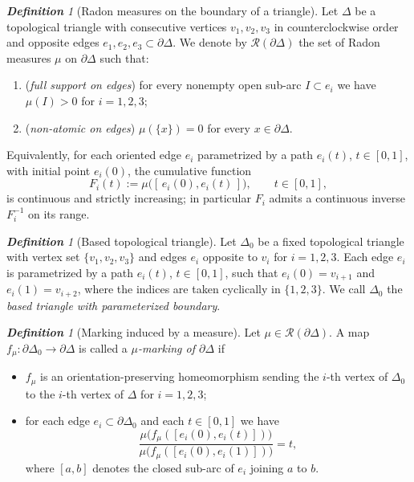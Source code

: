 \documentclass[11pt, letterpaper]{amsart}
\theoremstyle{definition}
\theoremstyle{remark}
\newtheorem{definition}[theorem]{\rm\bf Definition}
\newcommand{\cR}{\mathcal{R}}
\newcommand{\DEF}{} \newcommand{\WARN}{\textcolor{red}} \newcommand{\ALT}{\textcolor{brown}} \newcommand{\TODO}{\textcolor{teal}} %
\numberwithin{equation}{section}
\begin{document}
\begin{definition}[Radon measures on the boundary of a triangle]
\label{def:R(Delta)}
Let $\Delta$ be a topological triangle with consecutive vertices
$v_1,v_2,v_3$ in counterclockwise order and opposite edges
$e_1,e_2,e_3\subset\partial\Delta$.  We denote by $\cR(\partial\Delta)$ the set
of Radon measures $\mu$ on $\partial\Delta$ such that:
\begin{enumerate}
\item[(a)] (\emph{full support on edges}) for every nonempty open sub-arc
  $I\subset e_i$ we have $\mu(I)>0$ for $i=1,2,3$;
\item[(b)] (\emph{non-atomic on edges}) $\mu(\{x\})=0$ for every
  $x\in\partial\Delta$.
\end{enumerate}
Equivalently, for each oriented edge $e_i$ parametrized by a path
$e_i(t)$, \(t\in[0,1]\), with initial point $e_i(0)$, the cumulative function
\[
F_i(t):=\mu\big([\,e_i(0),e_i(t)\,]\big), \qquad t\in[0,1],
\]
is continuous and strictly increasing; in particular $F_i$ admits a continuous
inverse $F_i^{-1}$ on its range.
\end{definition}

\begin{definition}[Based topological triangle]
\label{def:based.triang}
Let $\Delta_0$ be a fixed topological triangle with vertex set
$\{v_1,v_2,v_3\}$ and edges $e_i$ opposite to $v_i$ for $i=1,2,3$.  Each edge
$e_i$ is parametrized by a path $e_i(t)$, \(t\in[0,1]\), such that
$e_i(0)=v_{i+1}$ and $e_i(1)=v_{i+2}$, where the indices are taken cyclically
in $\{1,2,3\}$.  We call $\Delta_0$ the \DEF{\em based triangle with
parameterized boundary}.
\end{definition}

\begin{definition}[Marking induced by a measure]
\label{def:edge.marking.triang.}
Let $\mu\in\cR(\partial\Delta)$.  A map
$f_{\mu}:\partial\Delta_0\rightarrow\partial\Delta$ is called a
\DEF{\em $\mu$-marking of $\partial\Delta$} if
\begin{itemize}
\item[(i)] $f_{\mu}$ is an orientation-preserving homeomorphism sending the
  $i$-th vertex of $\Delta_0$ to the $i$-th vertex of $\Delta$ for $i=1,2,3$;
\item[(ii)] for each edge $e_i\subset\partial\Delta_0$ and each $t\in[0,1]$ we have
\begin{equation}\label{eq:def.mark.triang.}
\frac{\mu\big(f_{\mu}([e_i(0),e_i(t)])\big)}
     {\mu\big(f_{\mu}([e_i(0),e_i(1)])\big)}
= t,
\end{equation}
where $[a,b]$ denotes the closed sub-arc of $e_i$ joining $a$ to $b$.
\end{itemize}
\end{definition}
\end{document}
